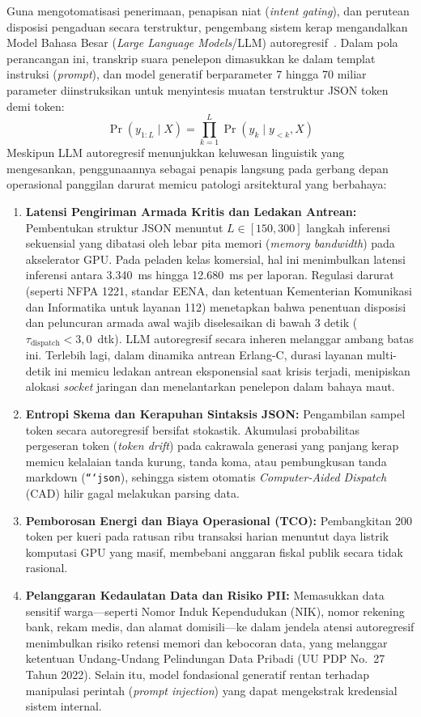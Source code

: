 \documentclass[journal,compsoc]{IEEEtran}
\begin{document}
Guna mengotomatisasi penerimaan, penapisan niat (\textit{intent gating}), dan perutean disposisi pengaduan secara terstruktur, pengembang sistem kerap mengandalkan Model Bahasa Besar (\textit{Large Language Models}/LLM) autoregresif~\cite{sahabatai2024,qwen2024,gemma2024}. Dalam pola perancangan ini, transkrip suara penelepon dimasukkan ke dalam templat instruksi (\textit{prompt}), dan model generatif berparameter 7 hingga 70 miliar parameter diinstruksikan untuk menyintesis muatan terstruktur JSON token demi token:
\begin{equation}
\Pr(y_{1:L} \mid X) = \prod_{k=1}^{L} \Pr(y_k \mid y_{<k}, X)
\end{equation}
Meskipun LLM autoregresif menunjukkan keluwesan linguistik yang mengesankan, penggunaannya sebagai penapis langsung pada gerbang depan operasional panggilan darurat memicu patologi arsitektural yang berbahaya:
\begin{enumerate}
    \item \textbf{Latensi Pengiriman Armada Kritis dan Ledakan Antrean:} Pembentukan struktur JSON menuntut $L \in [150, 300]$ langkah inferensi sekuensial yang dibatasi oleh lebar pita memori (\textit{memory bandwidth}) pada akselerator GPU. Pada peladen kelas komersial, hal ini menimbulkan latensi inferensi antara 3.340~ms hingga 12.680~ms per laporan. Regulasi darurat (seperti NFPA 1221, standar EENA, dan ketentuan Kementerian Komunikasi dan Informatika untuk layanan 112) menetapkan bahwa penentuan disposisi dan peluncuran armada awal wajib diselesaikan di bawah 3 detik ($\tau_{\text{dispatch}} < 3{,}0$~dtk). LLM autoregresif secara inheren melanggar ambang batas ini. Terlebih lagi, dalam dinamika antrean Erlang-C, durasi layanan multi-detik ini memicu ledakan antrean eksponensial saat krisis terjadi, menipiskan alokasi \textit{socket} jaringan dan menelantarkan penelepon dalam bahaya maut.
    \item \textbf{Entropi Skema dan Kerapuhan Sintaksis JSON:} Pengambilan sampel token secara autoregresif bersifat stokastik. Akumulasi probabilitas pergeseran token (\textit{token drift}) pada cakrawala generasi yang panjang kerap memicu kelalaian tanda kurung, tanda koma, atau pembungkusan tanda markdown (\texttt{```json}), sehingga sistem otomatis \textit{Computer-Aided Dispatch} (CAD) hilir gagal melakukan parsing data.
    \item \textbf{Pemborosan Energi dan Biaya Operasional (TCO):} Pembangkitan 200 token per kueri pada ratusan ribu transaksi harian menuntut daya listrik komputasi GPU yang masif, membebani anggaran fiskal publik secara tidak rasional.
    \item \textbf{Pelanggaran Kedaulatan Data dan Risiko PII:} Memasukkan data sensitif warga—seperti Nomor Induk Kependudukan (NIK), nomor rekening bank, rekam medis, dan alamat domisili—ke dalam jendela atensi autoregresif menimbulkan risiko retensi memori dan kebocoran data, yang melanggar ketentuan Undang-Undang Pelindungan Data Pribadi (UU PDP No.~27 Tahun 2022). Selain itu, model fondasional generatif rentan terhadap manipulasi perintah (\textit{prompt injection}) yang dapat mengekstrak kredensial sistem internal.
\end{enumerate}
\end{document}
